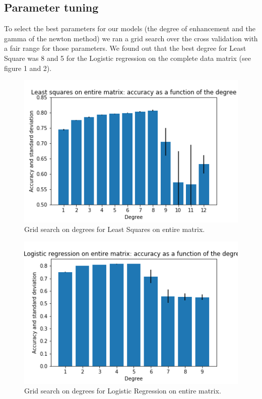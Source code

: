 \documentclass[10pt,conference,compsocconf]{IEEEtran}
\begin{document}
\subsection{Parameter tuning}
To select the best parameters for our models (the degree of enhancement and the gamma of the newton method) we ran a grid search over the cross validation with a fair range for those parameters. We found out that the best degree for Least Square was 8 and 5 for the Logistic regression on the complete data matrix (see figure 1 and 2).
\begin{figure}[tbp]
  \centering
  \includegraphics[width=\columnwidth]{ls_deg}
  \caption{Grid search on degrees for Least Squares on entire matrix.}
  \vspace{-3mm}
  \label{fig:denoise-fourier}
\end{figure}
\begin{figure}[tbp]
  \centering
  \includegraphics[width=\columnwidth]{lr_deg}
  \caption{Grid search on degrees for Logistic Regression on entire matrix.}
  \vspace{-3mm}
  \label{fig:denoise-fourier}
\end{figure}
\end{document}
